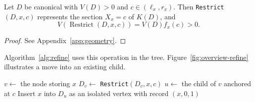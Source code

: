 \begin{algorithm}[H]
\caption{\texttt{Normalize}$(D)$: propagate the interval bounds.}
\label{alg:normalize}
\DontPrintSemicolon
{}
\end{algorithm}

\begin{lemma}\label{lem:interior}
Let $D$ be canonical with $V(D)>0$ and $c\in(\ell_x,r_x)$.
Then \textnormal{\texttt{Restrict}}$(D,x,c)$ represents the section
$X_x=c$ of $K(D)$, and
\begin{equation}\label{eq:restriction-volume}
V(\operatorname{Restrict}(D,x,c))=V(D)f_x(c)>0.
\end{equation}
\end{lemma}
\begin{proof}
See Appendix~\ref{app:geometry}.
\end{proof}

Algorithm~\ref{alg:refine} uses this operation in the tree.
Figure~\ref{fig:overview-refine} illustrates a move into an existing child.

\begin{algorithm}[H]
\caption{\texttt{RefineAt}$(x,c)$: move an item into a child.}
\label{alg:refine}
\DontPrintSemicolon
{}
$v\gets$ the node storing $x$\;
$D_v\gets$ \texttt{Restrict}$(D_v,x,c)$\;
$u\gets$ the child of $v$ anchored at $c$\;
Insert $x$ into $D_u$ as an isolated vertex with record $(x,0,1)$\;
\end{algorithm}

